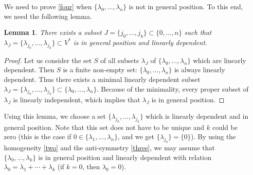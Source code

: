 \documentclass[12pt,amstex,amssymb]{article}
\theoremstyle{plain}
\newtheorem{lemma}[theorem]{Lemma}
\theoremstyle{definition}
\def\Q{{\mathbb Q}}
\def\l{\lambda}
\begin{document}
{We need to prove \eqref{four} when $\{\l_0, \ldots, \l_n\}$ is not in general position. To this end, we need the following lemma.
\begin{lemma}
There exists a subset $J =\{j_0, \ldots, j_k\} \subset \{0, \ldots, n\}$ such that $\l_J=\{\l_{j_0}, \ldots, \l_{j_k} \} \subset V^*$ is in general position and linearly dependent.
\end{lemma}
\begin{proof}
Let us consider the set $S$ of all subsets $\l_J$ of $\{\l_0, \ldots, \l_n\}$ which are linearly dependent. Then $S$ is a finite non-empty set: $\{\l_0, \ldots, \l_n\}$ is always linearly dependent. Thus there exists a minimal linearly dependent subset $\l_J=\{\l_{j_0}, \ldots, \l_{j_k} \} \subset \{\l_0, \ldots, \l_n\}$. 
Because of the minimality, every proper subset of $ \l_J$ is linearly independent, which implies that $\l_J$ is in general position.
\end{proof}

Using this lemma, we choose a set $\{\l_{j_0}, \ldots, \l_{j_k} \} $ which is linearly dependent and in general position. Note that this set does not have to be unique and $k$ could be zero (this is the case if $0 \in \{\l_1, \ldots, \l_n\}$, and we get $\{\l_{j_0}\}=\{0\}$). By using the homogeneity \eqref{two} and the anti-symmetry \eqref{three}, we may assume that $\{\l_{0}, \ldots, \l_{k}\}$ is in general position and linearly dependent with relation $\l_0=\l_1+ \cdots +\l_k$ (if $k=0$, then $\l_0=0$).

}
\end{document}
